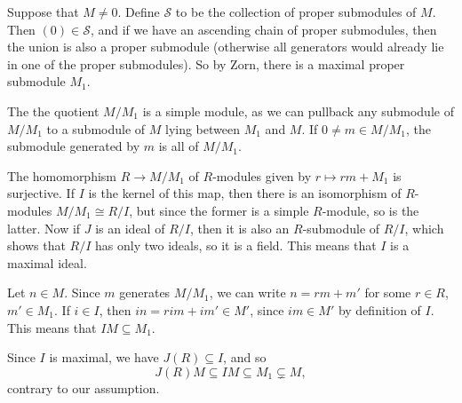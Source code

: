 Suppose that $M\neq 0$. Define $\mathcal{S}$ to be the collection of proper
submodules of $M$. Then $(0) \in \mathcal{S}$, and if we have an ascending chain
of proper submodules, then the union is also a proper submodule (otherwise all
generators would already lie in one of the proper submodules). So by Zorn,
there is a maximal proper submodule $M_1$.

The the quotient $M/M_1$ is a simple module, as we can pullback any submodule of
$M/M_1$ to a submodule of $M$ lying between $M_1$ and $M$. If $0\neq m \in M/M_1$,
the submodule generated by $m$ is all of $M/M_1$.

The homomorphism $R \to M/M_1$ of $R$-modules given by $r\mapsto rm + M_1$ is
surjective. If $I$ is the kernel of this map, then there is an isomorphism of
 $R$-modules $M/M_1 \cong R/I$, but since the former is a simple $R$-module, so is
the latter. Now if $J$ is an ideal of $R/I$, then it is also an $R$-submodule of
$R/I$, which shows that $R/I$ has only two ideals, so it is a field. This means
that $I$ is a maximal ideal.

Let $n \in M$. Since $m$ generates $M/M_1$, we can write $n = rm + m'$ for some
$r \in R$, $m' \in M_1$. If $i \in I$, then $in = rim + im' \in M'$, since
$im \in M'$ by definition of $I$. This means that $IM \subseteq M_1$.

Since $I$ is maximal, we have $J(R) \subseteq I$, and so
\[ J(R)M \subseteq IM \subseteq M_1 \subsetneq M, \]
contrary to our assumption.
